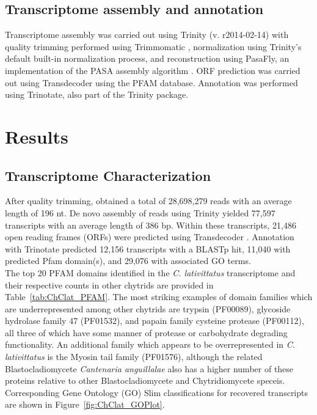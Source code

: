 \subsection*{Transcriptome assembly and annotation}
Transcriptome assembly was carried out using Trinity (v. r2014-02-14) \cite{Grabherr2011} with quality trimming performed using Trimmomatic \cite{Bolger2014}, normalization using Trinity's default built-in normalization process, and reconstruction using PasaFly, an implementation of the PASA assembly algorithm \cite{Haas2013}. ORF prediction was carried out using Transdecoder \cite{Haas2013} using the PFAM database. Annotation was performed using Trinotate, also part of the Trinity package.\\
\section{Results}
\subsection*{Transcriptome Characterization}
After quality trimming, obtained a total of 28,698,279 reads with an average length of 196 nt. De novo assembly of reads using Trinity \cite{Grabherr2011} yielded 77,597 transcripts with an average length of 386 bp. Within these transcripts, 21,486 open reading frames (ORFs) were predicted using Transdecoder \cite{Haas2013}. Annotation with Trinotate predicted 12,156 transcripts with a BLASTp hit, 11,040 with predicted Pfam domain(s), and 29,076 with associated GO terms. \\
\indent The top 20 PFAM domains identified in the \textit{C. lativittatus} transcriptome and their respective counts in other chytrids are provided in Table~\ref{tab:ChClat_PFAM}. The most striking examples of domain families which are underrepresented among other chytrids are trypsin (PF00089), glycoside hydrolase family 47 (PF01532), and papain family cysteine protease (PF00112), all three of which have some manner of protease or carbohydrate degrading functionality. An additional family which appears to be overrepresented in \textit{C. lativittatus} is the Myosin tail family (PF01576), although the related Blastocladiomycete \textit{Cantenaria anguillalae} also has a higher number of these proteins relative to other Blastocladiomycete and Chytridiomycete speceis. Corresponding Gene Ontology (GO) Slim classifications for recovered transcripts are shown in Figure~\ref{fig:ChClat_GOPlot}. \\
